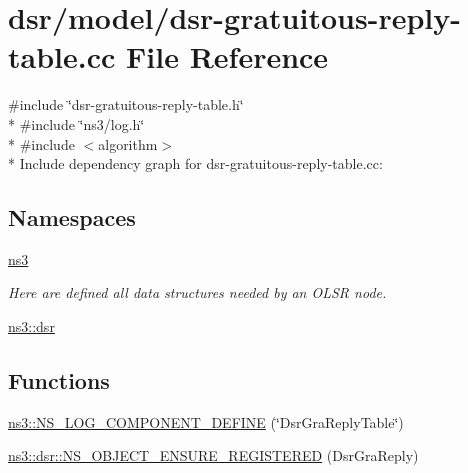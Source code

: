 \hypertarget{dsr-gratuitous-reply-table_8cc}{}\section{dsr/model/dsr-\/gratuitous-\/reply-\/table.cc File Reference}
\label{dsr-gratuitous-reply-table_8cc}
{\ttfamily \#include \char`\"{}dsr-\/gratuitous-\/reply-\/table.\+h\char`\"{}}\\*
{\ttfamily \#include \char`\"{}ns3/log.\+h\char`\"{}}\\*
{\ttfamily \#include $<$algorithm$>$}\\*
Include dependency graph for dsr-\/gratuitous-\/reply-\/table.cc\+:
\subsection*{Namespaces}
\begin{DoxyCompactItemize}
\item 
 \hyperlink{namespacens3}{ns3}
\begin{DoxyCompactList}\small\item\em Here are defined all data structures needed by an O\+L\+SR node. \end{DoxyCompactList}\item 
 \hyperlink{namespacens3_1_1dsr}{ns3\+::dsr}
\end{DoxyCompactItemize}
\subsection*{Functions}
\begin{DoxyCompactItemize}
\item 
\hyperlink{namespacens3_ae303faee692e304c9e331af29df99a9d}{ns3\+::\+N\+S\+\_\+\+L\+O\+G\+\_\+\+C\+O\+M\+P\+O\+N\+E\+N\+T\+\_\+\+D\+E\+F\+I\+NE} (\char`\"{}Dsr\+Gra\+Reply\+Table\char`\"{})
\item 
\hyperlink{namespacens3_1_1dsr_a175f8ac8b9433513f377d9d163bd1d1b}{ns3\+::dsr\+::\+N\+S\+\_\+\+O\+B\+J\+E\+C\+T\+\_\+\+E\+N\+S\+U\+R\+E\+\_\+\+R\+E\+G\+I\+S\+T\+E\+R\+ED} (Dsr\+Gra\+Reply)
\end{DoxyCompactItemize}
